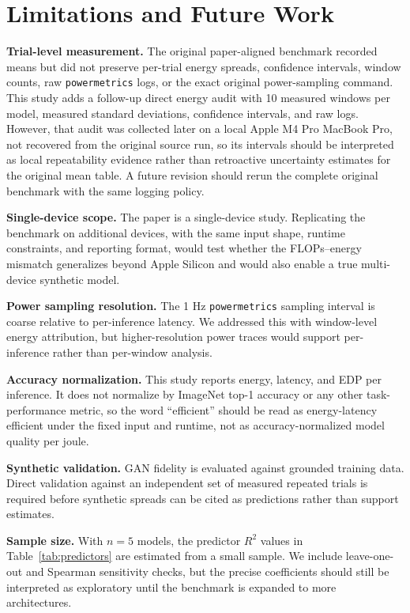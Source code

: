 \documentclass{svproc}
\begin{document}
\section{Limitations and Future Work}
\label{sec:limitations}
\textbf{Trial-level measurement.} The original paper-aligned benchmark
recorded means but did not preserve per-trial energy spreads, confidence
intervals, window counts, raw \texttt{powermetrics} logs, or the exact
original power-sampling command. This study adds a follow-up direct
energy audit with 10 measured windows per model, measured standard deviations,
confidence intervals, and raw logs. However, that audit was collected later on
a local Apple M4 Pro MacBook Pro, not recovered from the original source run, so
its intervals should be interpreted as local repeatability evidence rather
than retroactive uncertainty estimates for the original mean table. A future
revision should rerun the complete original benchmark with the same logging
policy.

\textbf{Single-device scope.} The paper is a single-device study. Replicating
the benchmark on additional devices, with the same input shape, runtime
constraints, and reporting format, would test whether the FLOPs--energy
mismatch generalizes beyond Apple Silicon and would also enable a true
multi-device synthetic model.

\textbf{Power sampling resolution.} The 1 Hz \texttt{powermetrics} sampling
interval is coarse relative to per-inference latency. We addressed this with
window-level energy attribution, but higher-resolution power traces would
support per-inference rather than per-window analysis.

\textbf{Accuracy normalization.} This study reports energy, latency, and EDP
per inference. It does not normalize by ImageNet top-1 accuracy or any other
task-performance metric, so the word ``efficient'' should be read as
energy-latency efficient under the fixed input and runtime, not as
accuracy-normalized model quality per joule.

\textbf{Synthetic validation.} GAN fidelity is evaluated against grounded
training data. Direct validation against an independent set of measured
repeated trials is required before synthetic spreads can be cited as
predictions rather than support estimates.

\textbf{Sample size.} With $n = 5$ models, the predictor $R^2$ values in
Table~\ref{tab:predictors} are estimated from a small sample. We include
leave-one-out and Spearman sensitivity checks, but the precise coefficients
should still be interpreted as exploratory until the benchmark is expanded to
more architectures.
\end{document}
